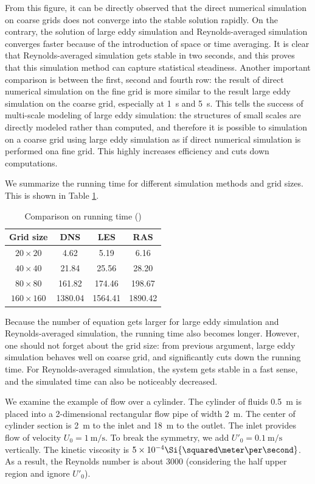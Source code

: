 \documentclass[english, nochinese]{pkupaper}
\begin{document}
From this figure, it can be directly observed that the direct numerical simulation on coarse grids does not converge into the stable solution rapidly. On the contrary, the solution of large eddy simulation and Reynolds-averaged simulation converges faster because of the introduction of space or time averaging. It is clear that Reynolds-averaged simulation gets stable in two seconds, and this proves that this simulation method can capture statistical steadiness. Another important comparison is between the first, second and fourth row: the result of direct numerical simulation on the fine grid is more similar to the result large eddy simulation on the coarse grid, especially at \SI{1}{\second} and \SI{5}{\second}. This tells the success of multi-scale modeling of large eddy simulation: the structures of small scales are directly modeled rather than computed, and therefore it is possible to simulation on a coarse grid using large eddy simulation as if direct numerical simulation is performed ona fine grid. This highly increases efficiency and cuts down computations.

We summarize the running time for different simulation methods and grid sizes. This is shown in Table \ref{Tbl:Run}.

\begin{table}[htbp]
\centering
\caption{Comparison on running time (\Si{\second})}
\label{Tbl:Run}
\begin{tabular}{|c|c|c|c|}
\hline
Grid size & DNS & LES & RAS \\
\hline
$ 20 \times 20 $ & 4.62 & 5.19 & 6.16 \\
\hline
$ 40 \times 40 $ & 21.84 & 25.56 & 28.20 \\
\hline
$ 80 \times 80 $ & 161.82 & 174.46 & 198.67 \\
\hline
$ 160 \times 160 $ & 1380.04 & 1564.41 & 1890.42 \\
\hline
\end{tabular}
\end{table}

Because the number of equation gets larger for large eddy simulation and Reynolds-averaged simulation, the running time also becomes longer. However, one should not forget about the grid size: from previous argument, large eddy simulation behaves well on coarse grid, and significantly cuts down the running time. For Reynolds-averaged simulation, the system gets stable in a fast sense, and the simulated time can also be noticeably decreased.

We examine the example of flow over a cylinder. The cylinder of fluids \SI{0.5}{\meter} is placed into a 2-dimensional rectangular flow pipe of width \SI{2}{\meter}. The center of cylinder section is \SI{2}{\meter} to the inlet and \SI{18}{\meter} to the outlet. The inlet provides flow of velocity $ U_0 = \SI{1}{\meter\per\second} $. To break the symmetry, we add $ U'_0 = \SI{0.1}{\meter\per\second} $ vertically. The kinetic viscosity is $ 5 \times 10^{-4} \Si{\squared\meter\per\second} $. As a result, the Reynolds number is about 3000 (considering the half upper region and ignore $U'_0$).
\end{document}

